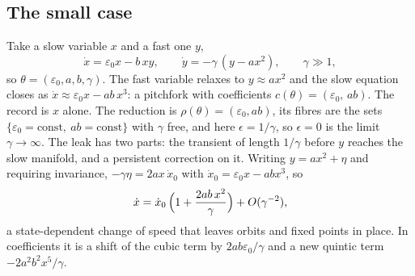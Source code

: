 \documentclass[10pt]{article}
\begin{document}
\subsection{The small case}
Take a slow variable $x$ and a fast one $y$,
\begin{equation}
\dot x=\varepsilon_0 x-b\,xy,\qquad \dot y=-\gamma\,(y-a x^2),\qquad \gamma\gg1,
\label{eq:small}
\end{equation}
so $\theta=(\varepsilon_0,a,b,\gamma)$. The fast variable relaxes to $y\approx ax^2$ and the slow equation closes as $\dot x\approx\varepsilon_0x-ab\,x^3$: a pitchfork with coefficients $c(\theta)=(\varepsilon_0,\,ab)$. The record is $x$ alone. The reduction is $\rho(\theta)=(\varepsilon_0,ab)$, its fibres are the sets $\{\varepsilon_0=\text{const},\ ab=\text{const}\}$ with $\gamma$ free, and here $\epsilon=1/\gamma$, so $\epsilon=0$ is the limit $\gamma\to\infty$. The leak has two parts: the transient of length $1/\gamma$ before $y$ reaches the slow manifold, and a persistent correction on it. Writing $y=ax^2+\eta$ and requiring invariance, $-\gamma\eta=2ax\,\dot x_0$ with $\dot x_0=\varepsilon_0x-abx^3$, so
\begin{equation}
\dot x=\dot x_0\,\Bigl(1+\frac{2ab\,x^2}{\gamma}\Bigr)+O(\gamma^{-2}),
\label{eq:correction}
\end{equation}
a state-dependent change of speed that leaves orbits and fixed points in place. In coefficients it is a shift of the cubic term by $2ab\varepsilon_0/\gamma$ and a new quintic term $-2a^2b^2x^5/\gamma$.
\end{document}
